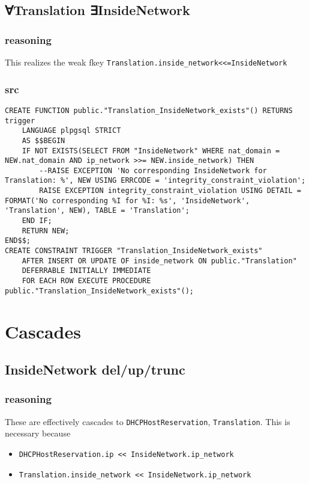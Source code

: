 \documentclass[11pt]{article}
\begin{document}
\subsection{∀Translation ∃InsideNetwork}
\label{sec:orgb5692ea}
\subsubsection{reasoning}
\label{sec:orga95e552}
This realizes the weak fkey \texttt{Translation.inside\_network<<=InsideNetwork}

\subsubsection{src}
\label{sec:org57e0ed3}
\begin{verbatim}
CREATE FUNCTION public."Translation_InsideNetwork_exists"() RETURNS trigger
    LANGUAGE plpgsql STRICT
    AS $$BEGIN
	IF NOT EXISTS(SELECT FROM "InsideNetwork" WHERE nat_domain = NEW.nat_domain AND ip_network >>= NEW.inside_network) THEN
		--RAISE EXCEPTION 'No corresponding InsideNetwork for Translation: %', NEW USING ERRCODE = 'integrity_constraint_violation';
		RAISE EXCEPTION integrity_constraint_violation USING DETAIL = FORMAT('No corresponding %I for %I: %s', 'InsideNetwork', 'Translation', NEW), TABLE = 'Translation';
	END IF;
	RETURN NEW;
END$$;
CREATE CONSTRAINT TRIGGER "Translation_InsideNetwork_exists"
    AFTER INSERT OR UPDATE OF inside_network ON public."Translation"
    DEFERRABLE INITIALLY IMMEDIATE
    FOR EACH ROW EXECUTE PROCEDURE public."Translation_InsideNetwork_exists"();
\end{verbatim}


\section{Cascades}
\label{sec:org470a0e8}
\subsection{InsideNetwork del/up/trunc}
\label{sec:org070e60a}
\subsubsection{reasoning}
\label{sec:org6dcd694}
These are effectively cascades to \texttt{DHCPHostReservation},
\texttt{Translation}.  This is necessary because
\begin{itemize}
\item \texttt{DHCPHostReservation.ip << InsideNetwork.ip\_network}
\item \texttt{Translation.inside\_network << InsideNetwork.ip\_network}
\end{itemize}
\end{document}
